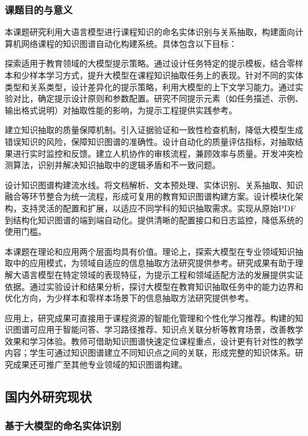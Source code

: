 \subsubsection{课题目的与意义}

本课题研究利用大语言模型进行课程知识的命名实体识别与关系抽取，构建面向计算机网络课程的知识图谱自动化构建系统。具体包含以下目标：

探索适用于教育领域的大模型提示策略。通过设计任务特定的提示模板，结合零样本和少样本学习方式，提升大模型在课程知识抽取任务上的表现。针对不同的实体类型和关系类型，设计差异化的提示策略，利用大模型的上下文学习能力。通过实验对比，确定提示设计原则和参数配置。研究不同提示元素（如任务描述、示例、输出格式说明）对抽取性能的影响，为提示工程提供实践参考。

建立知识抽取的质量保障机制。引入证据验证和一致性检查机制，降低大模型生成错误知识的风险，保障知识图谱的准确性。设计自动化的质量评估指标，对抽取结果进行实时监控和反馈。建立人机协作的审核流程，兼顾效率与质量。开发冲突检测算法，识别并解决知识抽取中的逻辑矛盾和不一致问题。

设计知识图谱构建流水线。将文档解析、文本预处理、实体识别、关系抽取、知识融合等环节整合为统一流程，形成可复用的教育知识图谱构建方案。设计模块化架构，支持灵活的配置和扩展，以适应不同学科的知识抽取需求。实现从原始PDF到结构化知识图谱的端到端自动化。提供清晰的配置接口和日志监控，降低系统的使用门槛。

本课题在理论和应用两个层面均具有价值。理论上，探索大模型在专业领域知识抽取中的应用模式，为领域自适应的信息抽取方法研究提供参考。研究成果有助于理解大语言模型在特定领域的表现特征，为提示工程和领域适配方法的发展提供实证依据。通过实验设计和结果分析，探讨大模型在教育知识抽取任务中的能力边界和优化方向，为少样本和零样本场景下的信息抽取方法研究提供参考。

应用上，研究成果可直接用于课程资源的智能化管理和个性化学习推荐。构建的知识图谱可应用于智能问答、学习路径推荐、知识点关联分析等教育场景，改善教学效果和学习体验。教师可借助知识图谱快速定位课程重点，设计更有针对性的教学内容；学生可通过知识图谱建立不同知识点之间的关联，形成完整的知识体系。研究成果还可推广至其他专业领域的知识图谱构建。

\subsection{国内外研究现状}

\subsubsection{基于大模型的命名实体识别}

